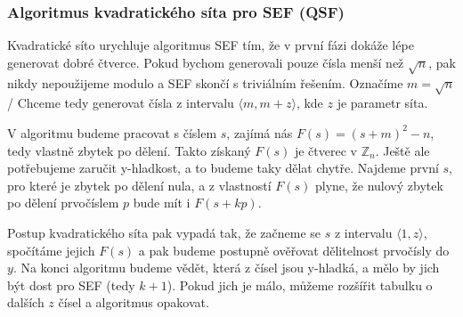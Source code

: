 \documentclass[10pt,a4paper]{article}
\begin{document}
\subsubsection{Algoritmus kvadratického síta pro SEF (QSF)}
Kvadratické síto urychluje algoritmus SEF tím, že v první fázi dokáže lépe
generovat dobré čtverce. Pokud bychom generovali pouze čísla menší než
$\sqrt{n}$, pak nikdy nepoužijeme modulo a SEF skončí s triviálním řešením.
Označíme $m = \sqrt{n}$/ Chceme tedy generovat čísla z intervalu $\langle m, m +
z \rangle$, kde $z$ je parametr síta. 

V algoritmu budeme pracovat s číslem $s$, zajímá nás $F(s) = (s + m)^2 - n$,
tedy vlastně zbytek po dělení. Takto získaný $F(s)$ je čtverec v $\mathbb{Z}_n$.
Ještě ale potřebujeme zaručit y-hladkost, a to budeme taky dělat chytře. Najdeme
první $s$, pro které je zbytek po dělení nula, a z vlastností $F(s)$ plyne, že
nulový zbytek po dělení prvočíslem $p$ bude mít i $F(s + kp)$.

Postup kvadratického síta pak vypadá tak, že začneme se $s$ z intervalu $\langle
1, z\rangle$, spočítáme jejich $F(s)$ a pak budeme postupně ověřovat dělitelnost
prvočísly do $y$. Na konci algoritmu budeme vědět, která z čísel jsou y-hladká,
a mělo by jich být dost pro SEF (tedy $k+1$). Pokud jich je málo, můžeme
rozšířit tabulku o dalších $z$ čísel a algoritmus opakovat.
\end{document}
